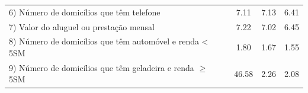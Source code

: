 \documentclass[]{book}
\theoremstyle{definition}
\theoremstyle{definition}
\theoremstyle{definition}
\theoremstyle{remark}
\begin{document}
\begin{longtable}[]{@{}lccc@{}}
\begin{minipage}[t]{0.24\columnwidth}
6) Número de domicílios que têm telefone\strut
\end{minipage} & \begin{minipage}[t]{0.19\columnwidth}\centering\strut
7.11\strut
\end{minipage} & \begin{minipage}[t]{0.20\columnwidth}\centering\strut
7.13\strut
\end{minipage} & \begin{minipage}[t]{0.26\columnwidth}\centering\strut
6.41\strut
\end{minipage}\tabularnewline
\begin{minipage}[t]{0.24\columnwidth}\raggedright\strut
7) Valor do aluguel ou prestação mensal\strut
\end{minipage} & \begin{minipage}[t]{0.19\columnwidth}\centering\strut
7.22\strut
\end{minipage} & \begin{minipage}[t]{0.20\columnwidth}\centering\strut
7.02\strut
\end{minipage} & \begin{minipage}[t]{0.26\columnwidth}\centering\strut
6.45\strut
\end{minipage}\tabularnewline
\begin{minipage}[t]{0.24\columnwidth}\raggedright\strut
8) Número de domicílios que têm automóvel e renda \textless{} 5SM\strut
\end{minipage} & \begin{minipage}[t]{0.19\columnwidth}\centering\strut
1.80\strut
\end{minipage} & \begin{minipage}[t]{0.20\columnwidth}\centering\strut
1.67\strut
\end{minipage} & \begin{minipage}[t]{0.26\columnwidth}\centering\strut
1.55\strut
\end{minipage}\tabularnewline
\begin{minipage}[t]{0.24\columnwidth}\raggedright\strut
9) Número de domicílios que têm geladeira e renda \(\geq\) 5SM\strut
\end{minipage} & \begin{minipage}[t]{0.19\columnwidth}\centering\strut
46.58\strut
\end{minipage} & \begin{minipage}[t]{0.20\columnwidth}\centering\strut
2.26\strut
\end{minipage} & \begin{minipage}[t]{0.26\columnwidth}\centering\strut
2.08\strut
\end{minipage}\tabularnewline
\bottomrule
\end{longtable}
\end{document}

